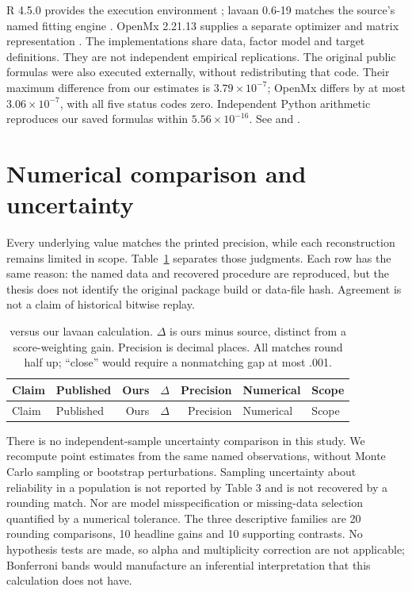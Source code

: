 R 4.5.0 provides the execution environment \citep{rcore}; lavaan 0.6-19 matches the source's named fitting engine \citep{rosseel}. OpenMx 2.21.13 supplies a separate optimizer and matrix representation \citep{neale}. The implementations share data, factor model and target definitions. They are not independent empirical replications. The original public formulas were also executed externally, without redistributing that code. Their maximum difference from our estimates is $3.79\times10^{-7}$; OpenMx differs by at most $3.06\times10^{-7}$, with all five status codes zero. Independent Python arithmetic reproduces our saved formulas within $5.56\times10^{-16}$. See  and .

\section{Numerical comparison and uncertainty}
Every underlying value matches the printed precision, while each reconstruction remains limited in scope. Table~\ref{tab:all} separates those judgments. Each row has the same reason: the named data and recovered procedure are reproduced, but the thesis does not identify the original package build or data-file hash. Agreement is not a claim of historical bitwise replay.
\begin{longtable}{llrrrll}
\caption{\citet[Paper I, Table 3]{moss} versus our lavaan calculation. $\Delta$ is ours minus source, distinct from a score-weighting gain. Precision is decimal places. All matches round half up; ``close'' would require a nonmatching gap at most .001.}\label{tab:all}\\
\toprule Claim & Published & Ours & $\Delta$ & Precision & Numerical & Scope\\\midrule\endfirsthead
\toprule Claim & Published & Ours & $\Delta$ & Precision & Numerical & Scope\\\midrule\endhead


\end{longtable}

There is no independent-sample uncertainty comparison in this study. We recompute point estimates from the same named observations, without Monte Carlo sampling or bootstrap perturbations. Sampling uncertainty about reliability in a population is not reported by Table 3 and is not recovered by a rounding match. Nor are model misspecification or missing-data selection quantified by a numerical tolerance. The three descriptive families are 20 rounding comparisons, 10 headline gains and 10 supporting contrasts. No hypothesis tests are made, so alpha and multiplicity correction are not applicable; Bonferroni bands would manufacture an inferential interpretation that this calculation does not have.

